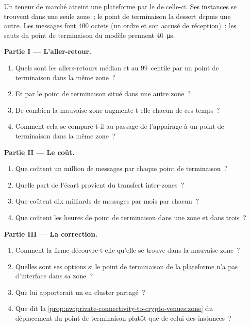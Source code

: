 \begin{problem}\label{pb:nw:private-connectivity-to-crypto-venues:1}
Un teneur de marché atteint une plateforme par le  de celle-ci. Ses instances se trouvent dans une seule zone~; le point de terminaison la dessert depuis une autre. Les messages font
400 octets (un ordre et son accusé de réception)~; les sauts du point de terminaison du modèle prennent \qty{40}{\micro\second}.

\medskip\noindent\textbf{Partie I --- L'aller-retour.}
\begin{enumerate}
\item Quels sont les allers-retours médian et au 99~centile par un point de terminaison dans la même zone~?
\item Et par le point de terminaison situé dans une autre zone~?
\item De combien la mauvaise zone augmente-t-elle chacun de ces temps~?
\item Comment cela se compare-t-il au passage de l'appairage à un point de terminaison dans la même zone~?
\end{enumerate}

\medskip\noindent\textbf{Partie II --- Le coût.}
\begin{enumerate}[resume]
\item Que coûtent un million de messages par chaque point de terminaison~?
\item Quelle part de l'écart provient du transfert inter-zones~?
\item Que coûtent dix milliards de messages par mois par chacun~?
\item Que coûtent les heures de point de terminaison dans une zone et dans trois~?
\end{enumerate}

\medskip\noindent\textbf{Partie III --- La correction.}
\begin{enumerate}[resume]
\item Comment la firme découvre-t-elle qu'elle se trouve dans la mauvaise zone~?
\item Quelles sont ses options si le point de terminaison de la plateforme n'a pas d'interface dans sa zone~?
\item Que lui apporterait un  en cluster partagé~?
\item Que dit la \cref{prop:nw:private-connectivity-to-crypto-venues:zone} du déplacement du point de terminaison plutôt que de celui des instances~?
\end{enumerate}


\end{problem}
